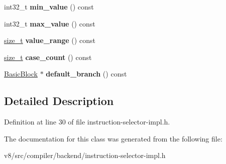 \begin{DoxyCompactItemize}
int32\+\_\+t {\bfseries min\+\_\+value} () const
\item 
\mbox{\label{classv8_1_1internal_1_1compiler_1_1SwitchInfo_a77c703328b9c2ba14d352abe272e7562}} 
int32\+\_\+t {\bfseries max\+\_\+value} () const
\item 
\mbox{\label{classv8_1_1internal_1_1compiler_1_1SwitchInfo_a5571e5bb11defe3bfc57260a3f7f2ead}} 
\mbox{\hyperlink{classsize__t}{size\+\_\+t}} {\bfseries value\+\_\+range} () const
\item 
\mbox{\label{classv8_1_1internal_1_1compiler_1_1SwitchInfo_a86a29ba90c36077caee32c2ba94b7200}} 
\mbox{\hyperlink{classsize__t}{size\+\_\+t}} {\bfseries case\+\_\+count} () const
\item 
\mbox{\label{classv8_1_1internal_1_1compiler_1_1SwitchInfo_a97c334fa5aa2ae65ccd7766360c79ab9}} 
\mbox{\hyperlink{classv8_1_1internal_1_1compiler_1_1BasicBlock}{Basic\+Block}} $\ast$ {\bfseries default\+\_\+branch} () const
\end{DoxyCompactItemize}


\subsection{Detailed Description}


Definition at line 30 of file instruction-\/selector-\/impl.\+h.



The documentation for this class was generated from the following file\+:\begin{DoxyCompactItemize}
\item 
v8/src/compiler/backend/instruction-\/selector-\/impl.\+h\end{DoxyCompactItemize}
